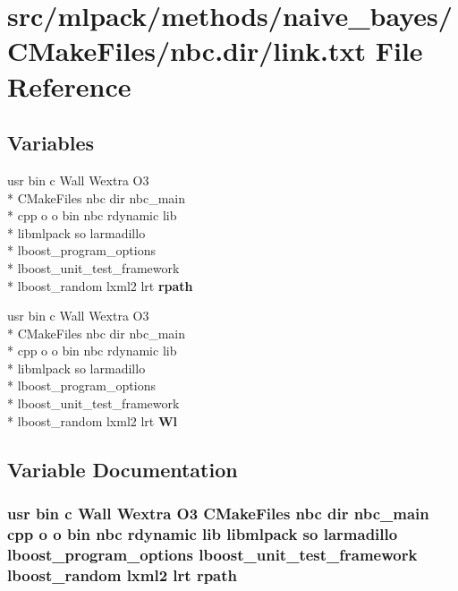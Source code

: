 \section{src/mlpack/methods/naive\-\_\-bayes/\-C\-Make\-Files/nbc.dir/link.txt File Reference}
\label{methods_2naive__bayes_2CMakeFiles_2nbc_8dir_2link_8txt}
\subsection*{Variables}
\begin{DoxyCompactItemize}
\item 
usr bin c Wall Wextra O3 \\*
C\-Make\-Files nbc dir nbc\-\_\-main \\*
cpp o o bin nbc rdynamic lib \\*
libmlpack so larmadillo \\*
lboost\-\_\-program\-\_\-options \\*
lboost\-\_\-unit\-\_\-test\-\_\-framework \\*
lboost\-\_\-random lxml2 lrt {\bf rpath}
\item 
usr bin c Wall Wextra O3 \\*
C\-Make\-Files nbc dir nbc\-\_\-main \\*
cpp o o bin nbc rdynamic lib \\*
libmlpack so larmadillo \\*
lboost\-\_\-program\-\_\-options \\*
lboost\-\_\-unit\-\_\-test\-\_\-framework \\*
lboost\-\_\-random lxml2 lrt {\bf Wl}
\end{DoxyCompactItemize}


\subsection{Variable Documentation}
\subsubsection[{rpath}]{\setlength{\rightskip}{0pt plus 5cm}usr bin c Wall Wextra O3 C\-Make\-Files nbc dir nbc\-\_\-main cpp o o bin nbc rdynamic lib libmlpack so larmadillo lboost\-\_\-program\-\_\-options lboost\-\_\-unit\-\_\-test\-\_\-framework lboost\-\_\-random lxml2 lrt rpath}\label{methods_2naive__bayes_2CMakeFiles_2nbc_8dir_2link_8txt_a6b632b8a75e74b43c519f1a844051f30}


